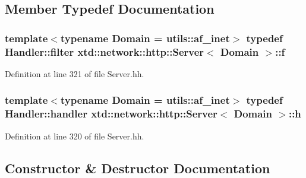 \subsection{Member Typedef Documentation}
\subsubsection[{\texorpdfstring{f}{f}}]{\setlength{\rightskip}{0pt plus 5cm}template$<$typename Domain  = utils\+::af\+\_\+inet$>$ typedef {\bf Handler\+::filter} {\bf xtd\+::network\+::http\+::\+Server}$<$ Domain $>$\+::{\bf f}\hspace{0.3cm}{\ttfamily [protected]}}\hypertarget{classxtd_1_1network_1_1http_1_1Server_a94d4867ec740265b62b7505584387240}{}\label{classxtd_1_1network_1_1http_1_1Server_a94d4867ec740265b62b7505584387240}


Definition at line 321 of file Server.\+hh.

\subsubsection[{\texorpdfstring{h}{h}}]{\setlength{\rightskip}{0pt plus 5cm}template$<$typename Domain  = utils\+::af\+\_\+inet$>$ typedef {\bf Handler\+::handler} {\bf xtd\+::network\+::http\+::\+Server}$<$ Domain $>$\+::{\bf h}\hspace{0.3cm}{\ttfamily [protected]}}\hypertarget{classxtd_1_1network_1_1http_1_1Server_af55090adba952bd4ddcd6eb467974ac8}{}\label{classxtd_1_1network_1_1http_1_1Server_af55090adba952bd4ddcd6eb467974ac8}


Definition at line 320 of file Server.\+hh.



\subsection{Constructor \& Destructor Documentation}
